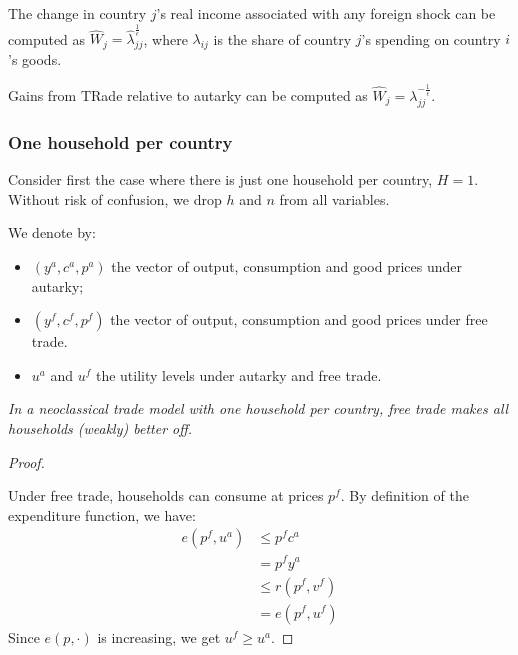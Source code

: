 \begin{proposition}
    The change in country $j$'s real income associated with any foreign shock can be computed as $\hat{W}_{j} = \hat{\lambda}_{jj} ^{\frac{1}{\epsilon}}$,
    where $\lambda_{ij} $ is the share of country $j$'s spending on country $i$'s goods.
\end{proposition}

\begin{corollary}
    Gains from TRade relative to autarky can be computed as $\hat{W}_{j} = \lambda_{jj}^{-\frac{1}{\epsilon}} $.
\end{corollary}

\subsubsection{One household per country}
Consider ﬁrst the case where there is just one household per country, $H=1$.
Without risk of confusion, we drop $h$ and $n$ from all variables.

We denote by:
\begin{itemize}
    \item $(y^a, c^a, p^a)$ the vector of output, consumption and good prices under autarky;
    \item $(y^f, c^f, p^f)$ the vector of output, consumption and good prices under free trade.
    \item $u^a$ and $u^f$ the utility levels under autarky and free trade.
\end{itemize}

\begin{proposition}\label{prop:1}
    \textit{In a neoclassical trade model with one household per country,
    free trade makes all households (weakly) better off.}
\end{proposition}

\begin{proof}
    \

    Under free trade, households can consume at prices $p^f$.
    By definition of the expenditure function, we have:
    \begin{align*}
        e(p^f, u^a) &\leq p^f c^a \\
        &= p^f y^a \\
        & \leq r(p^f, v^f) \\
        &= e(p^f, u^f)
    \end{align*}
    Since $e(p, \cdot)$ is increasing, we get $ u^f \geq u^a$.
\end{proof}

